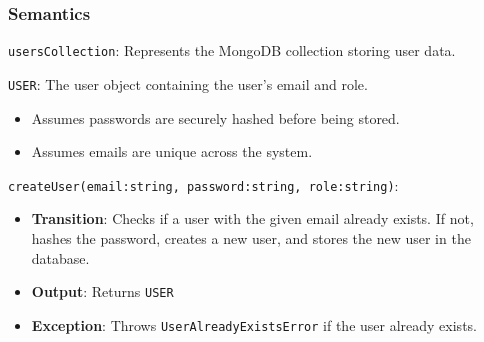 \documentclass[12pt, titlepage]{article}
\begin{document}
\subsubsection{Semantics}
\begin{description}
  \item[State Variables:]
  \item
  \texttt{usersCollection}: Represents the MongoDB collection storing user data.
  \item[Environment Variables:]
  \item \texttt{USER}: The user object containing the user's email and role.
  \item[Assumptions:]
  \item
  \begin{itemize}
    \item Assumes passwords are securely hashed before being stored.
  \end{itemize}
  \item
  \begin{itemize}
    \item Assumes emails are unique across the system.
  \end{itemize}

  \item[Access Routine Semantics:] 
  \item
  \texttt{createUser(email:string, password:string, role:string)}:
  \item
  \begin{itemize}
    \item \textbf{Transition}: Checks if a user with the given email already
    exists. If not, hashes the password, creates a new user, and stores the new
    user in the database.
  \end{itemize}
  \item
  \begin{itemize}
    \item \textbf{Output}: Returns \texttt{USER} 
  \end{itemize}
  \item
  \begin{itemize}
    \item \textbf{Exception}: Throws \texttt{UserAlreadyExistsError} if the user already exists.
  \end{itemize}


\end{description}
\end{document}
